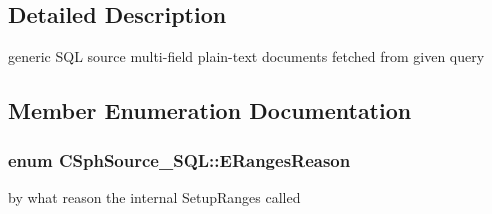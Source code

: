 \subsection{Detailed Description}
generic S\-Q\-L source multi-\/field plain-\/text documents fetched from given query 

\subsection{Member Enumeration Documentation}
\hypertarget{structCSphSource__SQL_adb285a8a9637c5528a46366089fdaccf}{
\subsubsection[{E\-Ranges\-Reason}]{\setlength{\rightskip}{0pt plus 5cm}enum {\bf C\-Sph\-Source\-\_\-\-S\-Q\-L\-::\-E\-Ranges\-Reason}\hspace{0.3cm}{\ttfamily [protected]}}}\label{structCSphSource__SQL_adb285a8a9637c5528a46366089fdaccf}


by what reason the internal Setup\-Ranges called 

